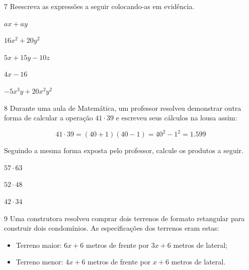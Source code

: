 \num{7} Reescreva as expressões a seguir colocando-as em evidência.

\begin{escolha}[itemsep=0pt]
\item $ax + ay$
    
\item $16x^2 + 20y^2$
    
\item $5x + 15y - 10z$
    
\item $4x - 16$
    
\item $-5x^3y + 20x^2y^2$
    
\end{escolha}

\num{8} Durante uma aula de Matemática, um professor resolveu demonstrar
outra forma de calcular a operação $41 \cdot 39$ e escreveu seus cálculos na
lousa assim:

$$41 \cdot 39 = (40 + 1) (40 - 1) = 40^2 - 1^2 = 1.599$$

Seguindo a mesma forma exposta pelo professor, calcule os produtos a seguir.

\begin{escolha}[itemsep=0pt]
\item $57 \cdot 63$
    


\item $52 \cdot 48$



\item $42 \cdot 34$


\end{escolha}

\num{9} Uma construtora resolveu comprar dois terrenos de formato retangular
para construir dois condomínios. As especificações dos terrenos eram estas:

\begin{itemize}
    \item Terreno maior: $6x + 6$ metros de frente por $3x + 6$ metros de lateral;
    \item Terreno menor: $4x + 6$ metros de frente por $x + 6$ metros de lateral.
\end{itemize}

